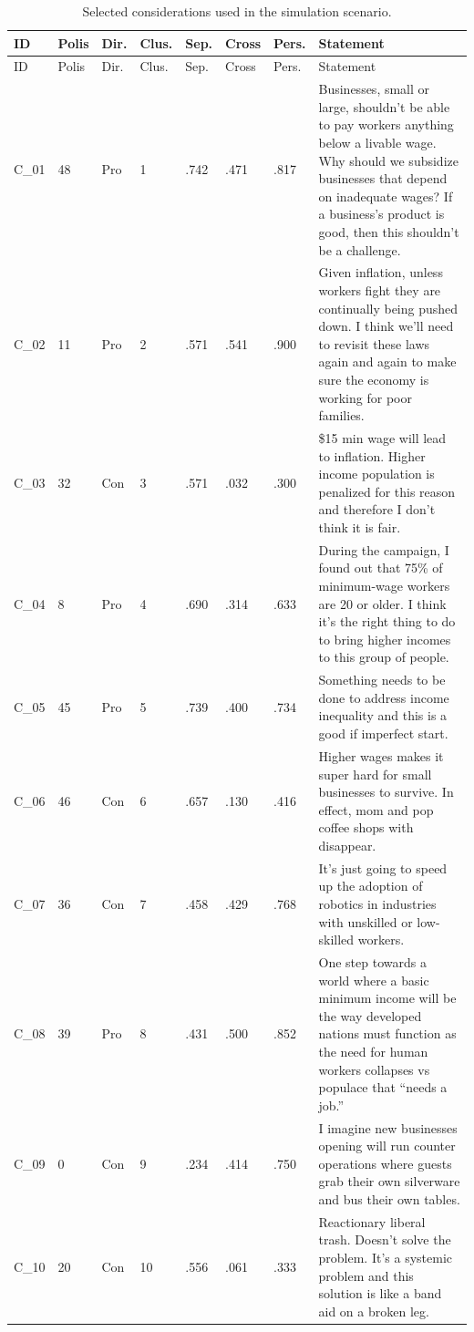 \begingroup
\scriptsize
\setlength{\tabcolsep}{2pt}
\begin{longtable}{p{0.34in}p{0.34in}p{0.30in}p{0.32in}p{0.36in}p{0.40in}p{0.40in}p{3.35in}}
\caption{Selected considerations used in the simulation scenario.}\label{tab:selected-considerations}\\
\toprule
ID & Polis & Dir. & Clus. & Sep. & Cross & Pers. & Statement \\
\midrule
\endfirsthead
\toprule
ID & Polis & Dir. & Clus. & Sep. & Cross & Pers. & Statement \\
\midrule
\endhead
\bottomrule
\endfoot
C\_01 & 48 & Pro & 1 & .742 & .471 & .817 & Businesses, small or large, shouldn't be able to pay workers anything below a livable wage. Why should we subsidize businesses that depend on inadequate wages? If a business's product is good, then this shouldn't be a challenge. \\
C\_02 & 11 & Pro & 2 & .571 & .541 & .900 & Given inflation, unless workers fight they are continually being pushed down. I think we'll need to revisit these laws again and again to make sure the economy is working for poor families. \\
C\_03 & 32 & Con & 3 & .571 & .032 & .300 & \$15 min wage will lead to inflation. Higher income population is penalized for this reason and therefore I don't think it is fair. \\
C\_04 & 8 & Pro & 4 & .690 & .314 & .633 & During the campaign, I found out that 75\% of minimum-wage workers are 20 or older. I think it's the right thing to do to bring higher incomes to this group of people. \\
C\_05 & 45 & Pro & 5 & .739 & .400 & .734 & Something needs to be done to address income inequality and this is a good if imperfect start. \\
C\_06 & 46 & Con & 6 & .657 & .130 & .416 & Higher wages makes it super hard for small businesses to survive. In effect, mom and pop coffee shops with disappear. \\
C\_07 & 36 & Con & 7 & .458 & .429 & .768 & It's just going to speed up the adoption of robotics in industries with unskilled or low-skilled workers. \\
C\_08 & 39 & Pro & 8 & .431 & .500 & .852 & One step towards a world where a basic minimum income will be the way developed nations must function as the need for human workers collapses vs populace that ``needs a job.'' \\
C\_09 & 0 & Con & 9 & .234 & .414 & .750 & I imagine new businesses opening will run counter operations where guests grab their own silverware and bus their own tables. \\
C\_10 & 20 & Con & 10 & .556 & .061 & .333 & Reactionary liberal trash. Doesn't solve the problem. It's a systemic problem and this solution is like a band aid on a broken leg. \\
\end{longtable}
\endgroup

